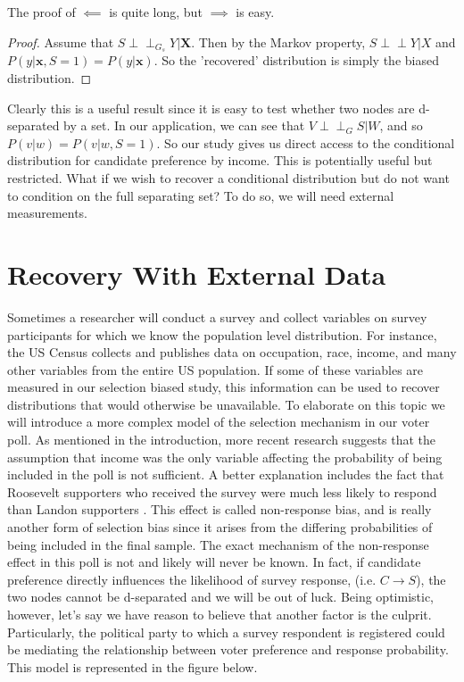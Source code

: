 \documentclass[12pt,twoside]{reedthesis}
\theoremstyle{definition}
\newcommand{\dsep}{\perp \!\!\!\perp}
\begin{document}
The proof of $\impliedby$ is quite long, but $\implies$ is easy. 

\begin{proof}
Assume that $S \dsep_{G_s} Y | \mathbf{X}$. Then by the Markov property, $S \dsep Y | X$ and $P(y | \mathbf{x}, S = 1) = P(y | \mathbf{x})$. So the 'recovered' distribution is simply the biased distribution.
\end{proof} 

Clearly this is a useful result since it is easy to test whether two nodes are d-separated by a set. In our application, we can see that $V \dsep_G S | W$, and so $P(v|w) = P(v|w, S = 1)$. So our study gives us direct access to the conditional distribution for candidate preference by income. This is potentially useful but restricted. What if we wish to recover a conditional distribution but do not want to condition on the full separating set? To do so, we will need external measurements.

\section{Recovery With External Data}

Sometimes a researcher will conduct a survey and collect variables on survey participants for which we know the population level distribution. For instance, the US Census collects and publishes data on occupation, race, income, and many other variables from the entire US population. If some of these variables are measured in our selection biased study, this information can be used to recover distributions that would otherwise be unavailable. To elaborate on this topic we will introduce a more complex model of the selection mechanism in our voter poll. As mentioned in the introduction, more recent research suggests that the assumption that income was the only variable affecting the probability of being included in the poll is not sufficient. A better explanation includes the fact that Roosevelt supporters who received the survey were much less likely to respond than Landon supporters \cite{lusinchi_2012}. This effect is called non-response bias, and is really another form of selection bias since it arises from the differing probabilities of being included in the final sample. The exact mechanism of the non-response effect in this poll is not and likely will never be known. In fact, if candidate preference directly influences the likelihood of survey response, (i.e. $C \rightarrow S$), the two nodes cannot be d-separated and we will be out of luck. Being optimistic, however, let's say we have reason to believe that another factor is the culprit. Particularly, the political party to which a survey respondent is registered could be mediating the relationship between voter preference and response probability. This model is represented in the figure below.
\end{document}

